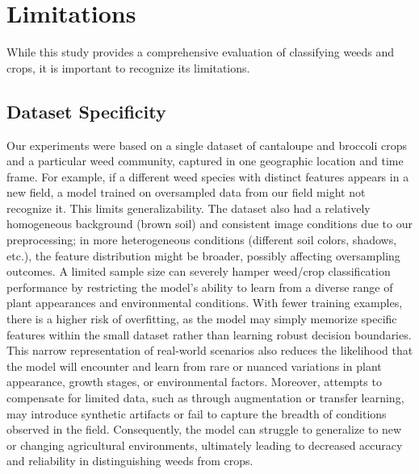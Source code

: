 \documentclass[letterpaper]{report}
\begin{document}
\section{Limitations}
\label{section:limitations}
While this study provides a comprehensive evaluation of classifying weeds and crops, it is important to recognize its limitations.

\subsection{Dataset Specificity}
Our experiments were based on a single dataset of cantaloupe and broccoli crops and a particular weed community, captured in one geographic location and time frame.  For example, if a different weed species with distinct features appears in a new field, a model trained on oversampled data from our field might not recognize it. This limits generalizability. The dataset also had a relatively homogeneous background (brown soil) and consistent image conditions due to our preprocessing; in more heterogeneous conditions (different soil colors, shadows, etc.), the feature distribution might be broader, possibly affecting oversampling outcomes.
A limited sample size can severely hamper weed/crop classification performance by restricting the model’s ability to learn from a diverse range of plant appearances and environmental conditions. With fewer training examples, there is a higher risk of overfitting, as the model may simply memorize specific features within the small dataset rather than learning robust decision boundaries. This narrow representation of real-world scenarios also reduces the likelihood that the model will encounter and learn from rare or nuanced variations in plant appearance, growth stages, or environmental factors. Moreover, attempts to compensate for limited data, such as through augmentation or transfer learning, may introduce synthetic artifacts or fail to capture the breadth of conditions observed in the field. Consequently, the model can struggle to generalize to new or changing agricultural environments, ultimately leading to decreased accuracy and reliability in distinguishing weeds from crops.
\end{document}
